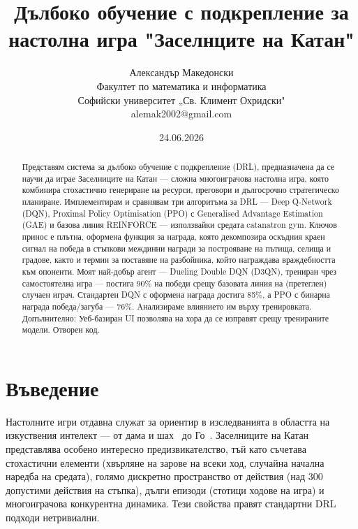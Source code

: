 \documentclass[11pt,a4paper]{article}
\begin{document}
%
%

\title{Дълбоко обучение с подкрепление за настолна игра "Заселнците на Катан"}

\author{
    Александър Македонски \\
    Факултет по математика и информатика \\
    Софийски университет „Св. Климент Охридски" \\
    {alemak2002@gmail.com} \\
}
\date{24.06.2026}
\maketitle

%
%
%

\begin{abstract} %
Представям система за дълбоко обучение с подкрепление (DRL), предназначена
да се научи да играе Заселниците на Катан --- сложна многоиграчова
настолна игра, която комбинира стохастично генериране на ресурси, преговори и
дългосрочно стратегическо планиране. Имплементирам и сравнявам три алгоритъма
за DRL --- Deep Q-Network (DQN), Proximal Policy Optimisation (PPO) с
Generalised Advantage Estimation (GAE) и базова линия REINFORCE --- използвайки
средата catanatron gym. Ключов принос е плътна, оформена функция за
награда, която декомпозира оскъдния краен сигнал на победа в
стъпкови междинни награди за построяване на пътища, селища и градове, както и
термин за поставяне на разбойника, който награждава враждебността към опоненти.
Моят най-добър агент --- Dueling Double DQN (D3QN), трениран чрез
самостоятелна игра --- постига 90\% на победи срещу базовата
линия на (претеглен) случаен играч. Стандартен DQN с оформена награда достига
85\%, а PPO с бинарна награда победа/загуба --- 76\%.
Aнализираме влиянието им върху тренировката. Допълнително: Уеб-базиран UI
позволява на хора да се изправят срещу тренираните модели. Отворен код. 
\end{abstract}

\section{Въведение}

Настолните игри отдавна служат за ориентир в изследванията в
областта на изкуствения интелект --- от дама и
шах~\citep{samuel1959some,silver2017mastering} до
Го~\citep{silver2016mastering}. Заселниците на Катан представлява
особено интересно предизвикателство, тъй като съчетава {стохастични
елементи} (хвърляне на зарове на всеки ход, случайна начална наредба на средата),
{голямо дискретно пространство от действия} (над 300 допустими действия
на стъпка), {дълги епизоди} (стотици ходове на игра) и
{многоиграчова конкурентна} динамика. Тези свойства правят стандартни DRL подходи нетривиални.
\end{document}
